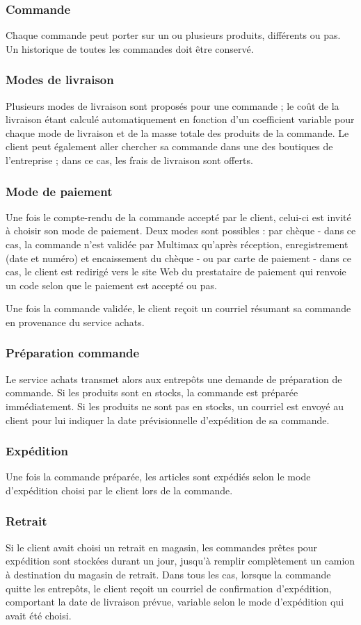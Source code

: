 \documentclass[a4paper,12pt]{article}
\begin{document}
\subsubsection*{Commande}
Chaque commande peut porter sur un ou plusieurs produits, différents ou pas.
Un historique de toutes les commandes doit être conservé.
\subsubsection*{Modes de livraison}
Plusieurs modes de livraison sont proposés pour une commande ;
le coût de la livraison étant calculé automatiquement en fonction d'un coefficient variable pour chaque mode de livraison et de la masse totale des produits de la commande.
Le client peut également aller chercher sa commande dans une des boutiques de l'entreprise ;
dans ce cas, les frais de livraison sont offerts.
\subsubsection*{Mode de paiement}
Une fois le compte-rendu de la commande accepté par le client, celui-ci est invité à choisir son mode de paiement. Deux modes sont possibles : par chèque - dans ce cas, la commande n'est validée par Multimax qu'après réception, enregistrement (date et numéro) et encaissement du chèque - ou par carte de paiement - dans ce cas, le client est redirigé vers le site Web du prestataire de paiement qui renvoie un code selon que le paiement est accepté ou pas.

Une fois la commande validée, le client reçoit un courriel résumant sa commande en provenance du service achats.
\subsubsection*{Préparation commande}
Le service achats transmet alors aux entrepôts une demande de préparation de commande. Si les produits sont en stocks, la commande est préparée immédiatement. Si les produits ne sont pas en stocks, un courriel est envoyé au client pour lui indiquer la date prévisionnelle d'expédition de sa commande.
\subsubsection*{Expédition}
Une fois la commande préparée, les articles sont expédiés selon le mode d'expédition choisi par le client lors de la commande.
\subsubsection*{Retrait}
Si le client avait choisi un retrait en magasin, les commandes prêtes pour expédition sont stockées durant un jour, jusqu'à remplir complètement un camion à destination du magasin de retrait.
Dans tous les cas, lorsque la commande quitte les entrepôts, le client reçoit un courriel de confirmation d'expédition, comportant la date de livraison prévue, variable selon le mode d'expédition qui avait été choisi.
\end{document}
